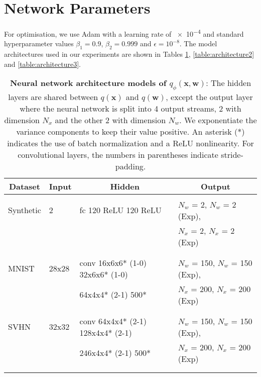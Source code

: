 \documentclass{article} \usepackage{iclr2017_conference,times}
\begin{document}




\appendix
{}
\section{Network Parameters}
\label{ap:params}
For optimisation, we use Adam \citep{kingma2014adam} with a learning rate of \num{e-4} and standard hyperparameter values $\beta_1 = 0.9$, $\beta_2 = 0.999$ and $\epsilon = 10^{-8}$. The model architectures used in our experiments are shown in Tables \ref{table:architecture1}, \ref{table:architecture2} and \ref{table:architecture3}.

\begin{table}[ht]
\caption{\textbf{Neural network architecture models of $q_{\phi}(\pmb{x},\pmb{w})$}: The hidden layers are shared between $q(\pmb{x})$ and $q(\pmb{w})$, except the output layer where the neural network is split into 4 output streams, 2 with dimension $N_x$ and the other 2 with dimension $N_w$. We exponentiate the variance components to keep their value positive. An asterisk (*) indicates the use of batch normalization and a ReLU nonlinearity. For convolutional layers, the numbers in parentheses indicate stride-padding.}
\label{table:architecture1}
\centering
\begin{tabular}{llll}
\multicolumn{1}{c}{\bf Dataset} &\multicolumn{1}{c}{\bf Input}  &\multicolumn{1}{c}{\bf Hidden}		&\multicolumn{1}{c}{\bf Output }
\\ \hline \\
Synthetic  & 2  &  fc 120 ReLU 120 ReLU  				            &  $N_w$ = 2, $N_w$ = 2 (Exp), \\
  & & 																						&	 $N_x$ = 2, $N_x$ = 2 (Exp) \\
\\ \hline \\
MNIST  &28x28 & conv 16x6x6* (1-0) 32x6x6* (1-0)  & $N_w$ = 150, $N_w$ = 150 (Exp),\\
  & &64x4x4* (2-1) 500* 														&	$N_x$ = 200, $N_x$ = 200 (Exp)\\
\\	\hline \\
SVHN  &32x32 & conv 64x4x4* (2-1) 128x4x4* (2-1)  & $N_w$ = 150, $N_w$ = 150 (Exp),\\
  & & 	246x4x4* (2-1) 500*											 	&	$N_x$ = 200, $N_x$ = 200 (Exp) \\
\\ \hline \\
\end{tabular}
\end{table}
\end{document}
